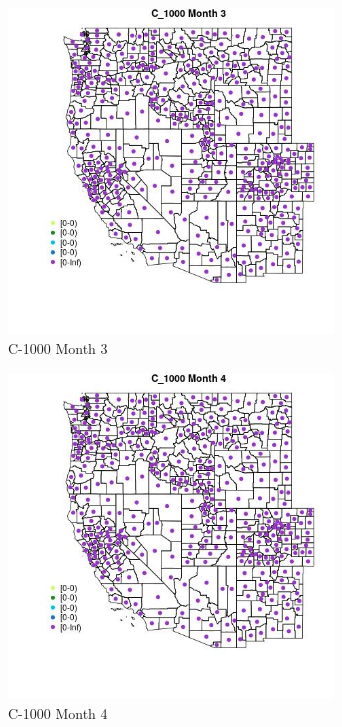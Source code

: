 \begin{figure} 
\centering  
\includegraphics[width=0.77\textwidth]{Code_Outputs/df_report_ML_predictors_CountyCentroid_Locations_Dates_2008-01-01to2018-12-31_MapObsMo3C_1000.jpg} 
\caption{\label{fig:df_report_ML_predictors_CountyCentroid_Locations_Dates_2008-01-01to2018-12-31MapObsMo3C_1000}C-1000 Month 3} 
\end{figure} 
 

\begin{figure} 
\centering  
\includegraphics[width=0.77\textwidth]{Code_Outputs/df_report_ML_predictors_CountyCentroid_Locations_Dates_2008-01-01to2018-12-31_MapObsMo4C_1000.jpg} 
\caption{\label{fig:df_report_ML_predictors_CountyCentroid_Locations_Dates_2008-01-01to2018-12-31MapObsMo4C_1000}C-1000 Month 4} 
\end{figure} 
 

